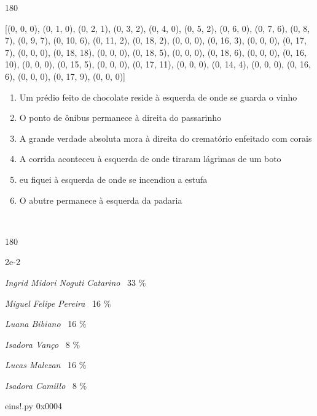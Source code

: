 \documentclass[12pt]{article}
\begin{document}
\pagebreak

	\begin{turn}{180}	
		\begin{minipage}{\textwidth}[(0, 0, 0), (0, 1, 0), (0, 2, 1), (0, 3, 2), (0, 4, 0), (0, 5, 2), (0, 6, 0), (0, 7, 6), (0, 8, 7), (0, 9, 7), (0, 10, 6), (0, 11, 2), (0, 18, 2), (0, 0, 0), (0, 16, 3), (0, 0, 0), (0, 17, 7), (0, 0, 0), (0, 18, 18), (0, 0, 0), (0, 18, 5), (0, 0, 0), (0, 18, 6), (0, 0, 0), (0, 16, 10), (0, 0, 0), (0, 15, 5), (0, 0, 0), (0, 17, 11), (0, 0, 0), (0, 14, 4), (0, 0, 0), (0, 16, 6), (0, 0, 0), (0, 17, 9), (0, 0, 0)]	  
				
		\end{minipage}	
	\end{turn} 

\pagebreak
\sffamily
\large

	\begin{enumerate}


\vfill \item
Um prédio feito de chocolate reside	%
à esquerda
de onde se guarda o vinho	%

\vfill \item
O ponto de ônibus permanece	%
à direita
do passarinho	%

\vfill \item
A grande verdade absoluta mora	%
à direita
do crematório enfeitado com corais	%

\vfill \item
A corrida aconteceu	%
à esquerda
de onde tiraram lágrimas de um boto	%

\vfill \item
eu fiquei	%
à esquerda
de onde se incendiou a estufa	%

\vfill \item
O abutre permanece	%
à esquerda
da padaria	%
	\end{enumerate}
\pagebreak
			\ttfamily %

	\ 
	\vfill
	\begin{turn}{180}	
		\begin{minipage}{\textwidth}
			\centering
			{\Huge 2e-2}
		  
			\hfill
		  
			

\textit{Ingrid Midori Noguti Catarino}
	\ 33 \%

\textit{Miguel Felipe Pereira}
	\ 16 \%

\textit{Luana Bibiano}
	\ 16 \%

\textit{Isadora Vanço}
	\ 8 \%

\textit{Lucas Malezan}
	\ 16 \%

\textit{Isadora Camillo}
	\ 8 \%

\bigskip

eins!.py
0x0004


		\end{minipage}	
	\end{turn}
	\vfill
	\
\end{document}

